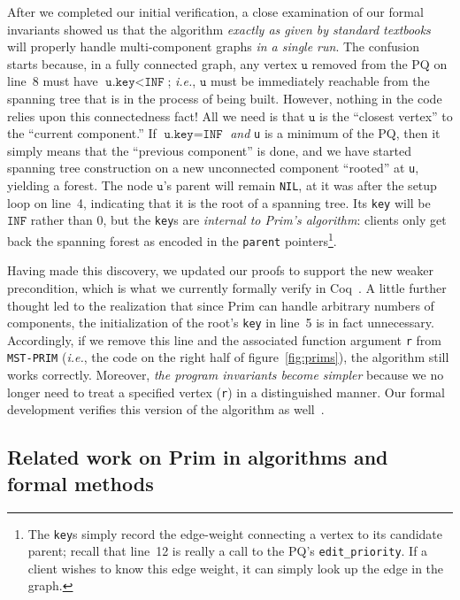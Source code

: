 After we completed our initial verification, a close examination of our formal invariants showed us that the algorithm \emph{exactly as given by standard textbooks} will properly handle multi-component graphs \textit{in a single run}.  The confusion starts because, in a fully connected graph, any vertex $\texttt{u}$ removed from the PQ on line~8 must have $\texttt{u.key} < \texttt{INF}$; \emph{i.e.}, $\texttt{u}$ must be immediately reachable from the spanning tree that is in the process of being built.  However, nothing in the code relies upon this connectedness fact!  All we need is that $\texttt{u}$ is the ``closest vertex'' to the ``current component.''  If $\texttt{u.key}=\texttt{INF}$ \emph{and} \texttt{u} is a minimum of the PQ, then it simply means that the ``previous component'' is done, and we have started spanning tree construction on a new unconnected component ``rooted'' at \texttt{u}, yielding a forest.  The node $\texttt{u}$'s parent will remain \texttt{NIL}, at it was after the setup loop on line~4, indicating that it is the root of a spanning tree.  Its \texttt{key} will be $\texttt{INF}$ rather than $0$, but the \texttt{key}s are \emph{internal to Prim's algorithm}: clients only get back the spanning forest as encoded in the \texttt{parent} pointers\footnote{The \texttt{key}s simply record the edge-weight connecting a vertex to its candidate parent; recall that line~12 is really a call to the PQ's \texttt{edit\_priority}.  If a client wishes to know this edge weight, it can simply look up the edge in the graph.}.

Having made this discovery, we updated our proofs to support the new weaker precondition, which is what we currently formally verify in Coq~\cite{Coq}.
A little further thought led to the realization that since Prim can handle arbitrary numbers of components, the initialization of the root's \texttt{key} in line~5 is in fact unnecessary.  Accordingly, if we remove this line and the associated function argument \texttt{r} from \texttt{MST-PRIM} (\emph{i.e.}, the code on the right half of figure~\ref{fig:prims}), the algorithm still works correctly.  Moreover, \emph{the program invariants become simpler} because we no longer need to treat a specified vertex (\texttt{r}) in a distinguished manner.  Our formal development verifies this version of the algorithm as well~\cite{mohan_anshuman_2021_4744665}.

\vspace*{-0.75em}
\subsection{Related work on Prim in algorithms and formal methods}
\label{sec:relworkprim}
\vspace*{-0.5em}

